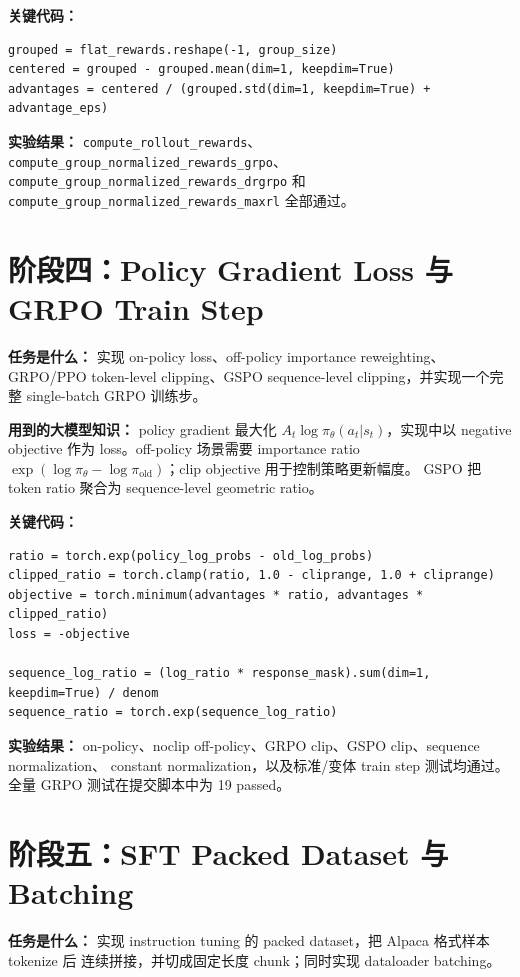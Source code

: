 \documentclass[UTF8]{ctexart}
\begin{document}
\textbf{关键代码：}
\begin{verbatim}
grouped = flat_rewards.reshape(-1, group_size)
centered = grouped - grouped.mean(dim=1, keepdim=True)
advantages = centered / (grouped.std(dim=1, keepdim=True) + advantage_eps)
\end{verbatim}

\textbf{实验结果：} \texttt{compute\_rollout\_rewards}、
\texttt{compute\_group\_normalized\_rewards\_grpo}、
\texttt{compute\_group\_normalized\_rewards\_drgrpo} 和
\texttt{compute\_group\_normalized\_rewards\_maxrl} 全部通过。

\section{阶段四：Policy Gradient Loss 与 GRPO Train Step}

\textbf{任务是什么：} 实现 on-policy loss、off-policy importance reweighting、GRPO/PPO token-level
clipping、GSPO sequence-level clipping，并实现一个完整 single-batch GRPO 训练步。

\textbf{用到的大模型知识：} policy gradient 最大化
\(A_t \log \pi_\theta(a_t|s_t)\)，实现中以 negative objective 作为 loss。off-policy 场景需要
importance ratio \(\exp(\log\pi_\theta-\log\pi_{\text{old}})\)；clip objective 用于控制策略更新幅度。
GSPO 把 token ratio 聚合为 sequence-level geometric ratio。

\textbf{关键代码：}
\begin{verbatim}
ratio = torch.exp(policy_log_probs - old_log_probs)
clipped_ratio = torch.clamp(ratio, 1.0 - cliprange, 1.0 + cliprange)
objective = torch.minimum(advantages * ratio, advantages * clipped_ratio)
loss = -objective

sequence_log_ratio = (log_ratio * response_mask).sum(dim=1, keepdim=True) / denom
sequence_ratio = torch.exp(sequence_log_ratio)
\end{verbatim}

\textbf{实验结果：} on-policy、noclip off-policy、GRPO clip、GSPO clip、sequence normalization、
constant normalization，以及标准/变体 train step 测试均通过。全量 GRPO 测试在提交脚本中为
19 passed。

\section{阶段五：SFT Packed Dataset 与 Batching}

\textbf{任务是什么：} 实现 instruction tuning 的 packed dataset，把 Alpaca 格式样本 tokenize 后
连续拼接，并切成固定长度 chunk；同时实现 dataloader batching。
\end{document}
